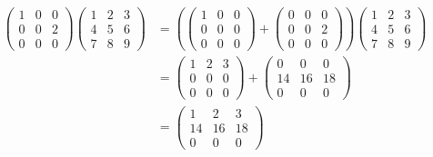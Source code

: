 \begin{example}
\begin{align*}
    \begin{pmatrix}
       1  &0  &0  \\
       0  &0  &2  \\
       0  &0  &0
    \end{pmatrix}
    \begin{pmatrix}
       1  &2  &3  \\
       4  &5  &6  \\
       7  &8  &9
    \end{pmatrix}
  &=(  \begin{pmatrix}
          1  &0  &0  \\
          0  &0  &0  \\
          0  &0  &0
       \end{pmatrix}
    +
       \begin{pmatrix}
          0  &0  &0  \\
          0  &0  &2  \\
          0  &0  &0
       \end{pmatrix}     )
      \begin{pmatrix}
         1  &2  &3  \\
         4  &5  &6  \\
         7  &8  &9
      \end{pmatrix}                      \\
  &=\begin{pmatrix}
       1  &2  &3  \\
       0  &0  &0  \\
       0  &0  &0
    \end{pmatrix}
  +
    \begin{pmatrix}
       0  &0  &0  \\
      14  &16 &18 \\
       0  &0  &0
    \end{pmatrix}                        \\
  &=\begin{pmatrix}
       1  &2  &3  \\
      14  &16 &18 \\
       0  &0  &0
    \end{pmatrix}
\end{align*}
\end{example}

